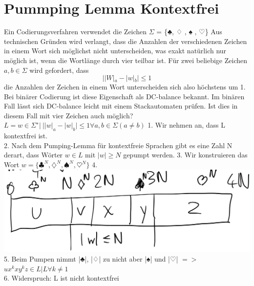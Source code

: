 \section{Pummping Lemma Kontextfrei}

Ein Codierungsverfahren verwendet die Zeichen $\Sigma$ = \{♣, ♢ , ♠ , ♡\} Aus technischen Gründen wird verlangt, dass die Anzahlen der verschiedenen Zeichen in einem Wort sich möglichst nicht unterscheiden, was exakt natürlich nur möglich ist, wenn die Wortlänge durch vier teilbar ist. Für zwei beliebige Zeichen $a,b \in \Sigma$ wird gefordert, dass \\
$$||W|_a - |w|_b| ≤ 1$$
die Anzahlen der Zeichen in einem Wort unterscheiden sich also höchstens um 1. Bei binärer Codierung ist diese Eigenschaft als DC-balance bekannt. Im binären Fall lässt sich DC-balance leicht mit einem Stackautomaten prüfen. Ist dies in diesem Fall mit vier Zeichen auch möglich? \\
$L = {w ∈ \Sigma^∗ | \ ||w|_a −|w|_b|≤ 1 ∀a,b ∈ \Sigma(a ≠ b)}$
1. Wir nehmen an, dass L kontextfrei ist. \\
2. Nach dem Pumping-Lemma für kontextfreie Sprachen gibt es eine Zahl N derart, dass Wörter $w ∈ L$ mit $|w|≥ N$ gepumpt werden.
3. Wir konstruieren das Wort $w = \{♣^N, ♢^N , ♠^N , ♡^N\}$
4. 
\includegraphics[width=\columnwidth]{img/kontexfreepump.png} \\
5. Beim Pumpen nimmt |♣|, |♢| zu nicht aber |♠| und |♡| $=>$ $ux^k xy^k z \in L | L \forall k ≠ 1$ \\
6. Widerspruch: L ist nicht kontextfrei

